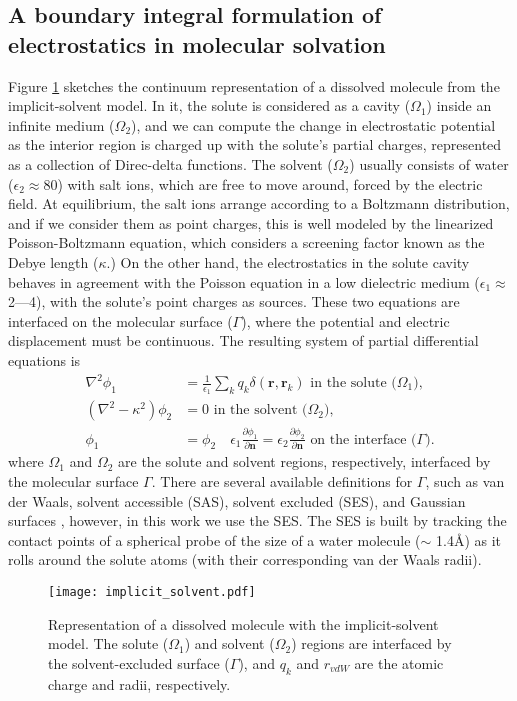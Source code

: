 \subsection{A boundary integral formulation of electrostatics in molecular solvation}

Figure \ref{fig:implicit_solvent} sketches the continuum representation of a dissolved molecule from the implicit-solvent model. 
In it, the solute is considered as a cavity ($\Omega_1$) inside an infinite medium ($\Omega_2$), and we can compute the change in electrostatic potential as the interior region is charged up with the solute's partial charges, represented as a collection of Direc-delta functions.
The solvent ($\Omega_2$) usually consists of water ($\epsilon_2\approx$80) with salt ions, which are free to move around, forced by the electric field. 
At equilibrium, the salt ions arrange according to a Boltzmann distribution, and if we consider them as point charges, this is well modeled by the linearized Poisson-Boltzmann equation, which considers a screening factor known as the Debye length ($\kappa$.) 
On the other hand, the electrostatics in the solute cavity behaves in agreement with the Poisson equation in a low dielectric medium ($\epsilon_1\approx$2---4), with the solute's point charges as sources.
These two equations are interfaced on the molecular surface ($\Gamma$), where the potential and electric displacement must be continuous.
The resulting system of partial differential equations is
%
\begin{align} \label{eq:pde}
\nabla^2\phi_1 &= \frac{1}{\epsilon_1}\sum_k q_k\delta(\mathbf{r},\mathbf{r}_k) \text{ in the solute ($\Omega_1$),}\nonumber\\
(\nabla^2-\kappa^2)\phi_2 &= 0 \text{ in the solvent ($\Omega_2$),}\nonumber\\
\phi_1 &= \phi_2 \quad \epsilon_1\frac{\partial \phi_1}{\partial\mathbf{n}} = \epsilon_2\frac{\partial \phi_2}{\partial\mathbf{n}} \text{ on the interface ($\Gamma$)}.
\end{align}
%
where $\Omega_1$ and $\Omega_2$ are the solute and solvent regions, respectively, interfaced by the molecular surface $\Gamma$.
There are several available definitions for $\Gamma$, such as van der Waals, solvent accessible (SAS), solvent excluded (SES), and Gaussian surfaces \cite{HarrisFenley2013}, however, in this work we use the SES.
The SES is built by tracking the contact points of a spherical probe of the size of a water molecule ($\sim$ 1.4\AA) as it rolls around the solute atoms (with their corresponding van der Waals radii). 
%
\begin{figure}
\centering
\texttt{[image: implicit\_solvent.pdf]}
\caption{Representation of a dissolved molecule with the implicit-solvent model. The solute ($\Omega_1$) and solvent ($\Omega_2$) regions are interfaced by the solvent-excluded surface ($\Gamma$), and $q_k$ and $r_{vdW}$ are the atomic charge and radii, respectively.}
\label{fig:implicit_solvent}
\end{figure}

